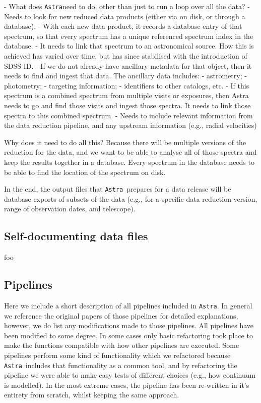\documentclass[modern]{aastex631}
\newcommand{\astra}{\texttt{Astra}}
\newcommand{\Astra}{\astra}
\begin{document}
- What does \Astra need to do, other than just to run a loop over all the data?
- Needs to look for new reduced data products (either via on disk, or through a database).
- With each new data product, it records a database entry of that spectrum, so that every spectrum has a unique referenced spectrum index in the database.
- It needs to link that spectrum to an astronomical source. How this is achieved has varied over time, but has since stabilised with the introduction of SDSS ID.
- If we do not already have ancillary metadata for that object, then it needs to find and ingest that data. The ancillary data includes:
    - astrometry;
    - photometry;
    - targeting information;
    - identifiers to other catalogs, etc.
- If this spectrum is a combined spectrum from multiple visits or exposures, then Astra needs to go and find those visits and ingest those spectra. It needs to link those spectra to this combined spectrum.
- Needs to include relevant information from the data reduction pipeline, and any upstream information (e.g., radial velocities)

Why does it need to do all this? 
Because there will be multiple versions of the reduction for the data, and we want to be able to analyse all of those spectra and keep the results together in a database. Every spectrum in the database needs to be able to find the location of the spectrum on disk.

In the end, the output files that \astra\ prepares for a data release will be database exports of subsets of the data (e.g., for a specific data reduction version, range of observation dates, and telescope). 

\subsection{Self-documenting data files}
foo

\subsection{Pipelines}
Here we include a short description of all pipelines included in \astra. 
In general we reference the original papers of those pipelines for detailed explanations, however, we do list any modifications made to those pipelines.
All pipelines have been modified to some degree. In some cases only basic refactoring took place to make the functions compatible with how other pipelines are executed. Some pipelines perform some kind of functionality which we refactored because \astra\ includes that functionality as a common tool, and by refactoring the pipeline we were able to make easy tests of different choices (e.g., how continuum is modelled). In the most extreme cases, the pipeline has been re-written in it's entirety from scratch, whilst keeping the same approach.
\end{document}
